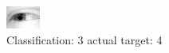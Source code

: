 \begin{figure}[h!]
\begin{center}
\includegraphics[width=0.60\columnwidth]{figures/ID2482_class_3_target_4.png}
\end{center}
\caption{ Classification: 3 actual target: 4}
\label{fig:ID2482_class_3_target_4}
\end{figure}
